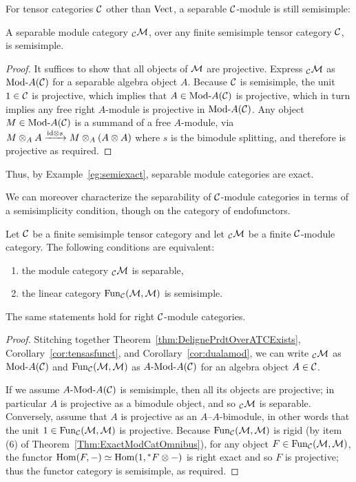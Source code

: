\documentclass{amsart}
\begin{document}
For tensor categories $\mathcal C$ other than $\mathrm{Vect}$, a separable $\mathcal C$-module is still semisimple:
\begin{proposition} \label{prop:sepmodissemi}
A separable module category ${}_\mathcal C \mathcal M$, over any finite semisimple tensor category $\mathcal C$, is semisimple.
\end{proposition}
\begin{proof}
It suffices to show that all objects of $\mathcal M$ are projective.  Express ${}_\mathcal C \mathcal M$ as $\Mod{}{A}(\cC)$ for a separable algebra object $A$.  Because $\mathcal C$ is semisimple, the unit $1 \in \mathcal C$ is projective, which implies that $A \in \Mod{}{A}(\cC)$ is projective, which in turn implies any free right $A$-module is projective in $\Mod{}{A}(\cC)$.  Any object $M \in \Mod{}{A}(\cC)$ is a summand of a free $A$-module, via $M \otimes_A A \xrightarrow{\mathrm{id} \otimes s} M \otimes_A (A \otimes A)$ where $s$ is the bimodule splitting, and therefore is projective as required.
\end{proof}
\noindent Thus, by Example~\ref{eg:semiexact}, separable module categories are exact.

We can moreover characterize the separability of $\mathcal C$-module categories in terms of a semisimplicity condition, though on the category of endofunctors.
\begin{theorem} \label{thm:SepModCats}
Let $\mathcal C$ be a finite semisimple tensor category and let ${}_\mathcal C \mathcal M$ be a finite $\mathcal C$-module category.  The following conditions are equivalent:
\begin{enumerate}
\item the module category ${}_\mathcal C \mathcal M$ is separable,
\item the linear category $\operatorname{Fun}_{\mathcal C}(\mathcal M,\mathcal M)$ is semisimple.  
\end{enumerate}
The same statements hold for right $\mathcal C$-module categories.
\end{theorem}
\begin{proof}
Stitching together Theorem~\ref{thm:DelignePrdtOverATCExists}, Corollary~\ref{cor:tensasfunct}, and Corollary~\ref{cor:dualamod}, we can write ${}_\mathcal C \mathcal M$ as $\Mod{}{A}(\cC)$ and $\operatorname{Fun}_{\mathcal C}(\mathcal M,\mathcal M)$ as $\Mod{A}{A}(\cC)$ for an algebra object $A \in \mathcal C$.  

If we assume $\Mod{A}{A}(\cC)$ is semisimple, then all its objects are projective; in particular $A$ is projective as a bimodule object, and so ${}_\mathcal C \mathcal M$ is separable.  Conversely, assume that $A$ is projective as an $A$--$A$-bimodule, in other words that the unit $1 \in \operatorname{Fun}_{\mathcal C}(\mathcal M,\mathcal M)$ is projective.  Because $\operatorname{Fun}_{\mathcal C}(\mathcal M,\mathcal M)$ is rigid (by item (6) of Theorem~\ref{Thm:ExactModCatOmnibus}), for any object $F \in \operatorname{Fun}_{\mathcal C}(\mathcal M,\mathcal M)$, the functor $\operatorname{Hom}(F,-) \simeq \operatorname{Hom}(1,{}^* F \otimes -)$ is right exact and so $F$ is projective; thus the functor category is semisimple, as required.
\end{proof}
\end{document}
